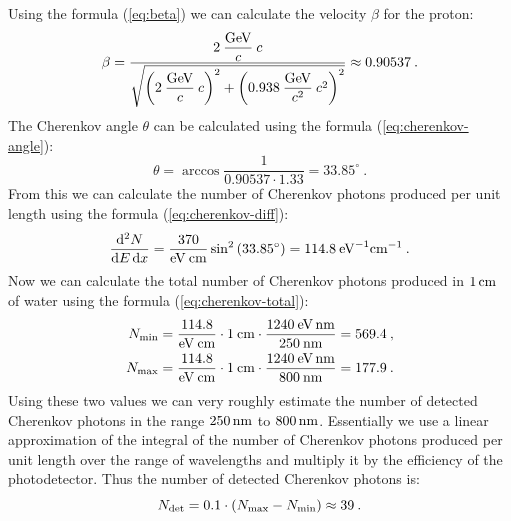 \documentclass[10pt, titlepage, a4paper]{article}
\newcommand{\dd}{\mathrm{d}}
\numberwithin{equation}{section}
\begin{document}
Using the formula (\ref{eq:beta}) we can calculate the velocity $\beta$ for the proton:
%
\begin{equation}
    \beta = \frac{2\>\dfrac{\rm{GeV}}{c}\>c}{\sqrt{\left(2\>\dfrac{\rm{GeV}}{c}\>c\right)^2 + \left(0.938\>\dfrac{\rm{GeV}}{c^2}\>c^2\right)^2}} \approx 0.90537\>.
\end{equation}
%
The Cherenkov angle $\theta$ can be calculated using the formula (\ref{eq:cherenkov-angle}):
%
\begin{equation}
    \theta = \arccos{\frac{1}{0.90537\cdot 1.33}} = 33.85^\circ\>.
\end{equation}
%
From this we can calculate the number of Cherenkov photons produced per unit length using the formula (\ref{eq:cherenkov-diff}):
%
\begin{equation}
    \frac{\dd^2 N}{\dd E\,\dd x} = \frac{370}{\rm{eV}\>\rm{cm}}\sin^2{(33.85^\circ)} = 114.8\>\rm{eV}^{-1}\rm{cm}^{-1}\>.
\end{equation}
%
Now we can calculate the total number of Cherenkov photons produced in $1\,\rm{cm}$ of water using the formula (\ref{eq:cherenkov-total}):
%
\begin{align}
    N_{\rm{min}} &= \frac{114.8}{\rm{eV}\>\rm{cm}}\cdot 1\>\rm{cm}\cdot \frac{1240\>\rm{eV}\,\rm{nm}}{250\>\rm{nm}} = 569.4\>, \\
    N_{\rm{max}} &= \frac{114.8}{\rm{eV}\>\rm{cm}}\cdot 1\>\rm{cm}\cdot \frac{1240\>\rm{eV}\,\rm{nm}}{800\>\rm{nm}} = 177.9\>.
\end{align}
%
Using these two values we can very roughly estimate the number of detected Cherenkov photons in the range $250\,\rm{nm}$ to $800\,\rm{nm}$.
Essentially we use a linear approximation of the integral of the number of Cherenkov photons produced per unit length over the range of wavelengths and 
multiply it by the efficiency of the photodetector. Thus the number of detected Cherenkov photons is:
%
\begin{equation}
    N_{\rm{det}} = 0.1\cdot (N_{\rm{max}} - N_{\rm{min}}) \approx 39\>.
\end{equation}
\end{document}
